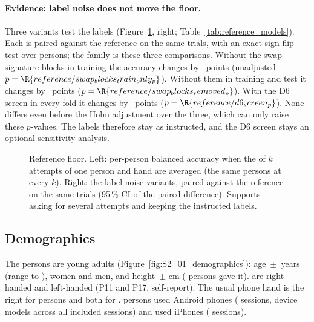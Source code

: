 \paragraph{Evidence: label noise does not move the floor.} Three variants test the labels
(Figure~\ref{fig:S2_21_reference_sensitivity}, right; Table~\ref{tab:reference_models}). Each is paired against
the reference on the same trials, with an exact sign-flip test over persons; the family is these three
comparisons. Without the swap-signature blocks in training the accuracy changes by
~points (unadjusted $p = \R{reference/swap_blocks_train_only_p}$).
Without them in training and test it changes by ~points
($p = \R{reference/swap_blocks_removed_p}$). With the D6 screen in every fold it changes by
~points ($p = \R{reference/d6_screen_p}$). None differs even before the Holm
adjustment over the three, which can only raise these $p$-values. The labels therefore stay as instructed, and
the D6 screen stays an optional sensitivity analysis.

\begin{figure}[htbp]
\centering
{}
\caption{Reference floor. Left: per-person balanced accuracy when the \pright{} of $k$ attempts of one person
and hand are averaged (the same  persons at every $k$). Right: the label-noise
variants, paired against the reference on the same trials (95\,\% CI of the paired difference). Supports asking
for several attempts and keeping the instructed labels.}
\label{fig:S2_21_reference_sensitivity}
\end{figure}



\subsection{Demographics}\label{app:data:demographics}

The  persons are young adults (Figure~\ref{fig:S2_01_demographics}): age
\,$\pm$\, years (range  to ),
 women and  men, and height \,$\pm$\,\,cm
( persons gave it).  are right-handed and
 left-handed (P11 and P17, self-report). The usual phone hand is the right for
 persons and both for . 
persons used Android phones ( sessions,  device models
across all included sessions) and  used iPhones ( sessions).

